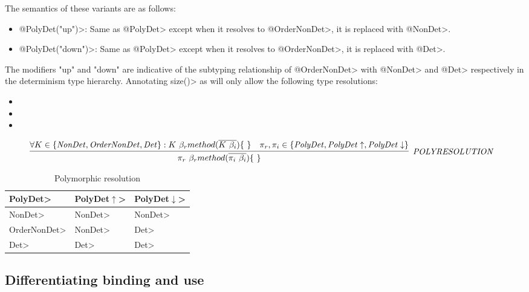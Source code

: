 The semantics of these variants are as follows:
\begin{itemize}
    \item \<@PolyDet("up")>: Same as \<@PolyDet> except when it resolves to \<@OrderNonDet>, it is replaced with \<@NonDet>.
    \item \<@PolyDet("down")>: Same as \<@PolyDet> except when it resolves to \<@OrderNonDet>, it is replaced with \<@Det>.
\end{itemize} 
The modifiers "up" and "down" are indicative of the subtyping relationship of \<@OrderNonDet> with \<@NonDet> and \<@Det> respectively
in the determinism type hierarchy.
Annotating \<size()> as  will only allow the following type resolutions:
\begin{itemize}
    \item {}
    \item {}
    \item {}
\end{itemize}

\begin{figure}
    $\infer[\sc{\mathit{POLY RESOLUTION}}]{\pi_r \ \beta_r method(\overline{\pi_i \ \beta_i})\{\ \}}{\forall K \in \{\mathit{NonDet, OrderNonDet, Det\}} : K \ \beta_r method(\overline{K \ \beta_i})\{\ \} & \pi_r, \pi_i \in \{\mathit{PolyDet}, \mathit{PolyDet}\uparrow, \mathit{PolyDet}\downarrow    \}}$
\end{figure}

\begin{table}[]
    \begin{tabular}{|l|l|l|}
        \hline
        \textbf{\<PolyDet>} & \textbf{\<PolyDet$\uparrow$>} & \textbf{\<PolyDet$\downarrow$>} \\ \hline
        \<NonDet> & \<NonDet> &  \<NonDet>\\ \hline
        \<OrderNonDet> & \<NonDet> &  \<Det>\\ \hline
        \<Det> & \<Det> &  \<Det>\\ \hline
    \end{tabular}
\caption{Polymorphic resolution}
\label{tab-poly-resolutions}
\end{table}

\subsection{Differentiating binding and use}\label{bindings-uses}

